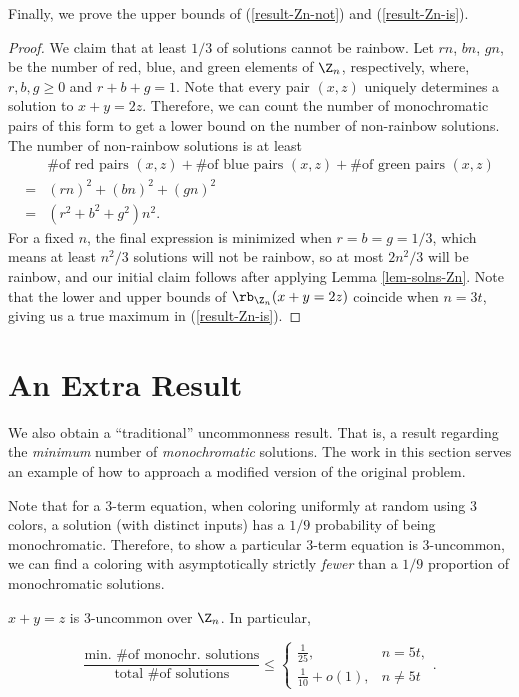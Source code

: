 Finally, we prove the upper bounds of (\ref{result-Zn-not}) and (\ref{result-Zn-is}).

\begin{proof}
We claim that at least $1/3$ of solutions cannot be rainbow.
Let $rn$, $bn$, $gn$, be the number of red, blue, and green elements of $\Z_n$, respectively,
where, $r, b, g \geq 0$ and $r + b + g = 1$.
Note that every pair $(x, z)$ uniquely determines a solution to $x + y = 2z$.
Therefore, we can count the number of monochromatic pairs of this form to get a lower bound on the 
number of non-rainbow solutions.
The number of non-rainbow solutions is at least
\begin{align*}
& \text{\# of red pairs $(x,z)$} + \text{\# of blue pairs $(x,z)$} + \text{\# of green pairs $(x,z)$} \\
=& (rn)^2 + (bn)^2 + (gn)^2 \\
=& (r^2 + b^2 + g^2)n^2.
\end{align*}
For a fixed $n$, the final expression is minimized when $r = b = g = 1/3$, which means at least $n^2/3$ 
solutions will not be rainbow, so at most $2n^2 / 3$ will be rainbow, and our initial claim follows after applying Lemma \ref{lem-solns-Zn}.
Note that the lower and upper bounds of $\rb_{\Z_n}(x + y = 2z)$ coincide when $n = 3t$, giving us a true maximum in (\ref{result-Zn-is}).
\end{proof}
    

\section{An Extra Result}\label{sec-extra}

We also obtain a ``traditional'' uncommonness result. 
That is, a result regarding the \textit{minimum} number of \textit{monochromatic} solutions.
The work in this section serves an example of how to approach a modified version of the original problem.

Note that for a $3$-term equation, when coloring uniformly at random using $3$ colors, a solution (with distinct inputs) has a
$1/9$ probability of being monochromatic. 
Therefore, to show a particular $3$-term equation is $3$-uncommon, we can find a coloring 
with asymptotically strictly \textit{fewer} than a $1/9$ proportion of monochromatic solutions.

\begin{theorem}\label{thm-alexis}
$x + y = z$ is $3$-uncommon over $\Z_n$.
In particular,

\begin{equation}\label{eq-schur-bounds}
\frac{\text{min. \# of monochr. solutions}}{\text{total \# of solutions}} \leq 
\begin{cases}
\frac{1}{25}, & n = 5t, \\
\frac{1}{10} + o(1), & n \neq 5t
\end{cases}.
\end{equation}
\end{theorem}

